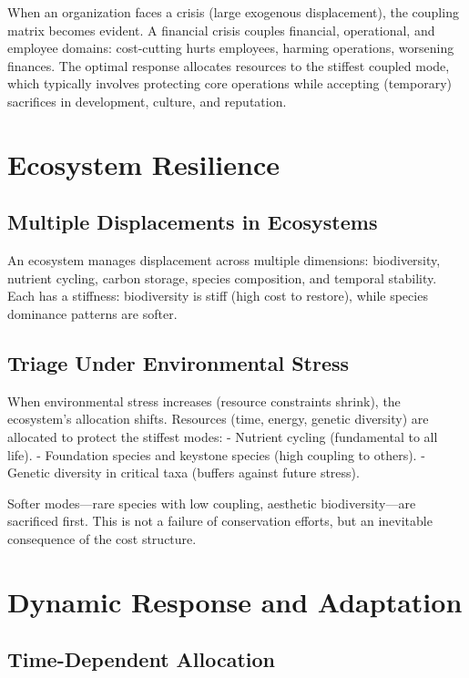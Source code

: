 \documentclass[12pt]{article}
\begin{document}
When an organization faces a crisis (large exogenous displacement), the coupling matrix becomes evident. A financial crisis couples financial, operational, and employee domains: cost-cutting hurts employees, harming operations, worsening finances. The optimal response allocates resources to the stiffest coupled mode, which typically involves protecting core operations while accepting (temporary) sacrifices in development, culture, and reputation.

\section{Ecosystem Resilience}

\subsection{Multiple Displacements in Ecosystems}

An ecosystem manages displacement across multiple dimensions: biodiversity, nutrient cycling, carbon storage, species composition, and temporal stability. Each has a stiffness: biodiversity is stiff (high cost to restore), while species dominance patterns are softer.

\subsection{Triage Under Environmental Stress}

When environmental stress increases (resource constraints shrink), the ecosystem's allocation shifts. Resources (time, energy, genetic diversity) are allocated to protect the stiffest modes:
- Nutrient cycling (fundamental to all life).
- Foundation species and keystone species (high coupling to others).
- Genetic diversity in critical taxa (buffers against future stress).

Softer modes—rare species with low coupling, aesthetic biodiversity—are sacrificed first. This is not a failure of conservation efforts, but an inevitable consequence of the cost structure.

\section{Dynamic Response and Adaptation}

\subsection{Time-Dependent Allocation}
\end{document}
